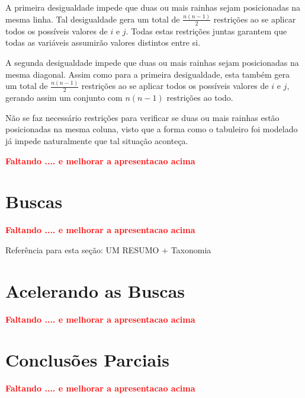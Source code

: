 A primeira desigualdade impede que duas ou mais rainhas sejam posicionadas na mesma linha. Tal desigualdade gera um total de $\frac{n(n-1)}{2}$ restrições ao se aplicar todos os possíveis valores de $i$ e $j$. Todas estas restrições juntas garantem que todas as variáveis assumirão valores distintos entre si.

A segunda desigualdade impede que duas ou mais rainhas sejam posicionadas na mesma diagonal. Assim como para a primeira desigualdade, esta também gera um total de $\frac{n(n-1)}{2}$ restrições ao se aplicar todos os possíveis valores de $i$ e $j$, gerando assim um conjunto com $n(n-1)$ restrições ao todo.

Não se faz necessário restrições para verificar se duas ou mais rainhas estão posicionadas na mesma coluna, visto que a forma como o tabuleiro foi modelado já impede naturalmente que tal situação aconteça.



{\bf \textcolor{red}{Faltando .... e melhorar a apresentacao acima}}

\section{Buscas}
{\bf \textcolor{red}{Faltando .... e melhorar a apresentacao acima}}

Referência para esta seção: \cite{rina2003}
UM RESUMO + Taxonomia

\section{Acelerando as Buscas}
{\bf \textcolor{red}{Faltando .... e melhorar a apresentacao acima}}




\section{Conclusões Parciais}
{\bf \textcolor{red}{Faltando .... e melhorar a apresentacao acima}}
